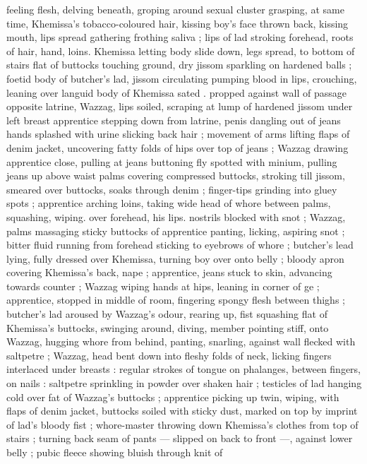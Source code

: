 feeling flesh, delving beneath, groping around sexual cluster 
grasping, at same time, Khemissa's tobacco-coloured hair, kissing 
boy's face thrown back, kissing mouth, lips spread gathering frothing 
saliva ; lips of lad stroking forehead, roots of hair, hand, loins. 
Khemissa letting body slide down, legs spread, to bottom of stairs 
flat of buttocks touching ground, dry jissom sparkling on hardened 
balls ; foetid body of butcher's lad, jissom circulating pumping blood 
in lips, crouching, leaning over languid body of Khemissa sated . 
propped against wall of passage opposite latrine, Wazzag, lips 
soiled, scraping at lump of hardened jissom under left breast 
apprentice stepping down from latrine, penis dangling out of jeans 
hands splashed with urine slicking back hair ; movement of arms 
lifting flaps of denim jacket, uncovering fatty folds of hips over top 
of jeans ; Wazzag drawing apprentice close, pulling at jeans 
buttoning fly spotted with minium, pulling jeans up above waist 
palms covering compressed buttocks, stroking till jissom, smeared 
over buttocks, soaks through denim ; finger-tips grinding into gluey 
spots ; apprentice arching loins, taking wide head of whore between 
palms, squashing, wiping. over forehead, his lips. nostrils blocked 
with snot ; Wazzag, palms massaging sticky buttocks of apprentice 
panting, licking, aspiring snot ; bitter fluid running from forehead 
sticking to eyebrows of whore ; butcher's lead lying, fully dressed 
over Khemissa, turning boy over onto belly ; bloody apron covering 
Khemissa's back, nape ; apprentice, jeans stuck to skin, advancing 
towards counter ; Wazzag wiping hands at hips, leaning in corner of 
ge ; apprentice, stopped in middle of room, fingering spongy 
flesh between thighs ; butcher's lad aroused by Wazzag's odour, 
rearing up, fist squashing flat of Khemissa's buttocks, swinging 
around, diving, member pointing stiff, onto Wazzag, hugging whore 
from behind, panting, snarling, against wall flecked with saltpetre ; 
Wazzag, head bent down into fleshy folds of neck, licking fingers 
interlaced under breasts : regular strokes of tongue on phalanges, 
between fingers, on nails : saltpetre sprinkling in powder over shaken 
hair ; testicles of lad hanging cold over fat of Wazzag's buttocks ; 
apprentice picking up twin, wiping, with flaps of denim jacket, 
buttocks soiled with sticky dust, marked on top by imprint of lad's 
bloody fist ; whore-master throwing down Khemissa's clothes from 
top of stairs ; turning back seam of pants --- slipped on back to front 
---, against lower belly ; pubic fleece showing bluish through knit of 
